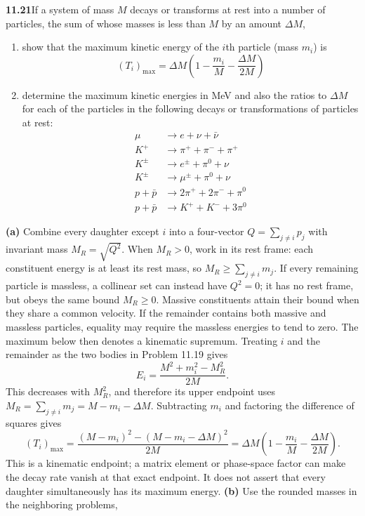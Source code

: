 \par\bigskip
\noindent\textbf{11.21}\quad If a system of mass $M$ decays or transforms at rest into a number of particles, the sum of whose masses is less than $M$ by an amount $\Delta M$,
\begin{enumerate}
\item[(a)] show that the maximum kinetic energy of the $i$th particle (mass $m_{i}$) is
\[
(T_{i})_{\max}=\Delta M\!\left(1-\frac{m_{i}}{M}-\frac{\Delta M}{2M}\right)
\]
\item[(b)] determine the maximum kinetic energies in MeV and also the ratios to $\Delta M$ for each of the particles in the following decays or transformations of particles at rest:
\begin{align*}
\mu&\to e+\nu+\bar{\nu}\\
K^{+}&\to\pi^{+}+\pi^{-}+\pi^{+}\\
K^{\pm}&\to e^{\pm}+\pi^{0}+\nu\\
K^{\pm}&\to\mu^{\pm}+\pi^{0}+\nu\\
p+\bar{p}&\to2\pi^{+}+2\pi^{-}+\pi^{0}\\
p+\bar{p}&\to K^{+}+K^{-}+3\pi^{0}
\end{align*}
\end{enumerate}
\solution
\textbf{(a)} Combine every daughter except $i$ into a
four-vector $Q=\sum_{j\ne i}p_j$ with invariant mass $M_R=\sqrt{Q^2}$.
When $M_R>0$, work in its rest frame: each constituent energy is
at least its rest mass, so $M_R\geq\sum_{j\ne i}m_j$.
If every remaining particle is massless, a collinear set can instead
have $Q^2=0$; it has no rest frame, but obeys the same bound
$M_R\geq0$.  Massive constituents attain their bound when they share
a common velocity.  If the remainder contains both massive and
massless particles, equality may require the massless energies to
tend to zero.  The maximum below then denotes a kinematic supremum. Treating $i$ and the
remainder as the two bodies in Problem 11.19 gives
\[
E_i=\frac{M^2+m_i^2-M_R^2}{2M}.
\]
This decreases with $M_R^2$, and therefore its upper endpoint
uses $M_R=\sum_{j\ne i}m_j=M-m_i-\Delta M$. Subtracting $m_i$
and factoring the difference of squares gives
\[
\boxed{(T_i)_{\max}=\frac{(M-m_i)^2-(M-m_i-\Delta M)^2}{2M}
=\Delta M\left(1-\frac{m_i}{M}-\frac{\Delta M}{2M}\right).}
\]
This is a kinematic endpoint; a matrix element or phase-space
factor can make the decay rate vanish at that exact endpoint.
It does not assert that every daughter simultaneously has its
maximum energy.
\textbf{(b)} Use the rounded masses in the neighboring problems,
